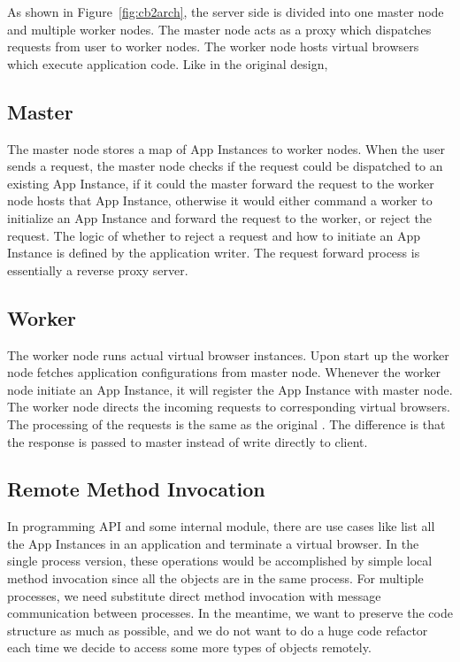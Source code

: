 
As shown in Figure~\ref{fig:cb2arch}, the server side is divided into one master node and multiple worker nodes.
The master node acts as a proxy which dispatches requests from user to worker nodes.
The worker node hosts virtual browsers which execute application code.
Like in the original design, 

\newarchitectureoverview{}
\requestdispatchdiagram{}
\appinstancefig{}


\subsection{Master}
The master node stores a map of App Instances to worker nodes.
When the user sends a request, 
the master node checks if the request could be dispatched to an existing App Instance,
if it could the master forward the request to the worker node hosts that App Instance, 
otherwise it would either command a worker to initialize an App Instance and forward the
request to the worker, or reject the request.
The logic of whether to reject a request and how to initiate an App Instance is defined by the application writer.
The request forward process is essentially a reverse proxy server.

\subsection{Worker}
The worker node runs actual virtual browser instances.
Upon start up the worker node fetches application configurations from master node.
Whenever the worker node initiate an App Instance, it will register the App Instance with master node.
The worker node directs the incoming requests to corresponding virtual browsers.
The processing of the requests is the same as the original \cb{}.
The difference is that the response is passed to master instead of write directly to client.


\subsection{Remote Method Invocation}
In \cb{} programming API and some internal module, there are use cases like list all the App Instances in an application 
and terminate a virtual browser.
In the single process version, these operations would be accomplished by simple local method invocation 
since all the objects are in the same process.
For multiple processes, 
we need substitute direct method invocation with message communication between processes.
In the meantime, we want to preserve the code structure as much as possible, 
and we do not want to do a huge code refactor each time we decide to access some more types of objects remotely.


